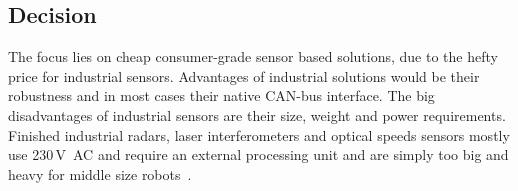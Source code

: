 \documentclass[12pt,a4paper]{article}
\begin{document}
%
%
%

\subsection{Decision}

The focus lies on cheap consumer-grade sensor based solutions, due to the hefty price for industrial sensors.
Advantages of industrial solutions would be their robustness and in most cases their native CAN-bus interface.
The big disadvantages of industrial sensors are their size, weight and power requirements.
Finished industrial radars, laser interferometers and optical speeds sensors mostly use 230\,V~AC and require an external processing unit and are simply too big and heavy for middle size robots~\cite{laser_vel, opt_vel, s_r_radar}.
\end{document}
